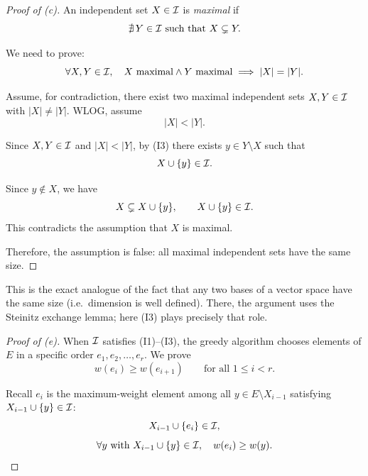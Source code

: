 \begin{solbox}[long]
\begin{solution}[(c)]
\begin{proof}[Proof of (c)]
    An independent set $X\in\mathcal{I}$ is \emph{maximal} if
    \[
        \nexists\, Y\in\mathcal{I} \text{ such that } X\subsetneq Y.
    \]

    We need to prove:
    \[
        \forall X,Y\in\mathcal{I},\quad X \text{ maximal} \wedge Y \text{
        maximal} \implies |X|=|Y|.
    \]

    Assume, for contradiction, there exist two maximal independent
    sets $X,Y\in\mathcal{I}$ with $|X|\ne|Y|$. WLOG, assume
    \[
        |X|<|Y|.
    \]

    Since $X,Y\in\mathcal{I}$ and $|X|<|Y|$, by (I3) there exists
    $y\in Y\setminus X$ such that
    \[
        X\cup\{y\}\in\mathcal{I}.
    \]

    Since $y\notin X$, we have
    \[
        X\subsetneq X\cup\{y\}, \qquad X\cup\{y\}\in\mathcal{I}.
    \]
    This contradicts the assumption that $X$ is maximal.

    Therefore, the assumption is false: all maximal independent sets
    have the same size.
\end{proof}

\begin{remark}
    This is the exact analogue of the fact that any two bases of a
    vector space have the same size (i.e.\ dimension is well
    defined). There, the argument uses the Steinitz exchange lemma;
    here (I3) plays precisely that role.
\end{remark}
\end{solution}

\begin{solution}[(d)]
\end{solution}

\begin{solution}[(e)]
\begin{proof}[Proof of (e)]
    When $\mathcal{I}$ satisfies (I1)--(I3), the greedy algorithm chooses
    elements of $E$ in a specific order $e_1,e_2,\dots,e_r$. We prove
    \[
        w(e_i) \ge w(e_{i+1}) \qquad \text{for all } 1\le i<r.
    \]

    Recall $e_i$ is the maximum-weight element among all
    $y\in E\setminus X_{i-1}$ satisfying $X_{i-1}\cup\{y\}\in\mathcal{I}$:
    \[
        X_{i-1}\cup\{e_i\}\in\mathcal{I},
    \]
    \[
        \forall y \text{ with } X_{i-1}\cup\{y\}\in\mathcal{I},\quad
        w(e_i)\ge w(y).
    \]


\end{proof}
\end{solution}
\end{solbox}
